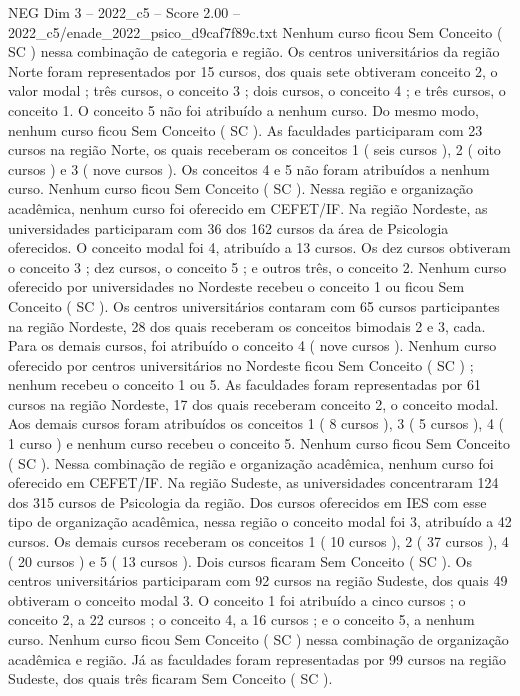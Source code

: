 \begin{textsample}{NEG Dim 3 – 2022\_c5 – Score 2.00 – 2022\_c5/enade\_2022\_psico\_d9caf7f89c.txt}
Nenhum curso ficou Sem Conceito ( SC ) nessa combinação de categoria e região.
Os centros universitários da região Norte foram representados por 15 cursos, dos quais sete obtiveram conceito 2, o valor modal ; três cursos, o conceito 3 ; dois cursos, o conceito 4 ; e três cursos, o conceito 1.
O conceito 5 não foi atribuído a nenhum curso.
Do mesmo modo, nenhum curso ficou Sem Conceito ( SC ).
As faculdades participaram com 23 cursos na região Norte, os quais receberam os conceitos 1 ( seis cursos ), 2 ( oito cursos ) e 3 ( nove cursos ).
Os conceitos 4 e 5 não foram atribuídos a nenhum curso.
Nenhum curso ficou Sem Conceito ( SC ).
Nessa região e organização acadêmica, nenhum curso foi oferecido em CEFET/IF.
Na região Nordeste, as universidades participaram com 36 dos 162 cursos da área de Psicologia oferecidos.
O conceito modal foi 4, atribuído a 13 cursos.
Os dez cursos obtiveram o conceito 3 ; dez cursos, o conceito 5 ; e outros três, o conceito 2.
Nenhum curso oferecido por universidades no Nordeste recebeu o conceito 1 ou ficou Sem Conceito ( SC ).
Os centros universitários contaram com 65 cursos participantes na região Nordeste, 28 dos quais receberam os conceitos bimodais 2 e 3, cada.
Para os demais cursos, foi atribuído o conceito 4 ( nove cursos ).
Nenhum curso oferecido por centros universitários no Nordeste ficou Sem Conceito ( SC ) ; nenhum recebeu o conceito 1 ou 5.
As faculdades foram representadas por 61 cursos na região Nordeste, 17 dos quais receberam conceito 2, o conceito modal.
Aos demais cursos foram atribuídos os conceitos 1 ( 8 cursos ), 3 ( 5 cursos ), 4 ( 1 curso ) e nenhum curso recebeu o conceito 5.
Nenhum curso ficou Sem Conceito ( SC ).
Nessa combinação de região e organização acadêmica, nenhum curso foi oferecido em CEFET/IF.
Na região Sudeste, as universidades concentraram 124 dos 315 cursos de Psicologia da região.
Dos cursos oferecidos em IES com esse tipo de organização acadêmica, nessa região o conceito modal foi 3, atribuído a 42 cursos.
Os demais cursos receberam os conceitos 1 ( 10 cursos ), 2 ( 37 cursos ), 4 ( 20 cursos ) e 5 ( 13 cursos ).
Dois cursos ficaram Sem Conceito ( SC ).
Os centros universitários participaram com 92 cursos na região Sudeste, dos quais 49 obtiveram o conceito modal 3.
O conceito 1 foi atribuído a cinco cursos ; o conceito 2, a 22 cursos ; o conceito 4, a 16 cursos ; e o conceito 5, a nenhum curso.
Nenhum curso ficou Sem Conceito ( SC ) nessa combinação de organização acadêmica e região.
Já as faculdades foram representadas por 99 cursos na região Sudeste, dos quais três ficaram Sem Conceito ( SC ).

\end{textsample}
